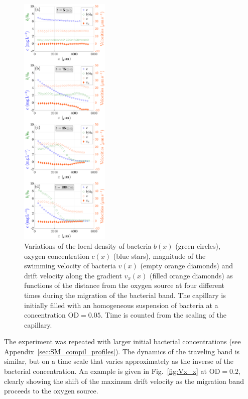 \documentclass[aps,a4paper,twocolumn,10pt,pre,showpacs]{revtex4-2}
\begin{document}
\begin{figure}[H]
\includegraphics[trim = 0mm 0mm 0mm 0mm, clip, width=0.38\textwidth, angle=0]{Fig03.pdf} 
\caption{Variations of the local density of bacteria $b(x)$ (green circles), oxygen concentration $c(x)$ (blue stars), magnitude of the swimming velocity of bacteria $v(x)$ (empty orange diamonds) and drift velocity along the gradient $v_x(x)$ (filled orange diamonds) as functions of the distance from the oxygen source at four different times during the migration of the bacterial band. The capillary is initially filled with an homogeneous suspension of bacteria at a concentration $\text{OD}=0.05$. Time is counted from the sealing of the capillary.}   
\label{fig:figure2}
\end{figure}

The experiment was repeated with larger initial bacterial concentrations (see Appendix~\ref{sec:SM_compil_profiles}). 
The dynamics of the traveling band is similar, but on a time scale that varies approximately as the inverse of the bacterial concentration. An example is given in Fig.~\ref{fig:Vx_x} at $\mathrm{OD}=0.2$, clearly showing the shift of the maximum drift velocity as the migration band proceeds to the oxygen source. 
\end{document}
